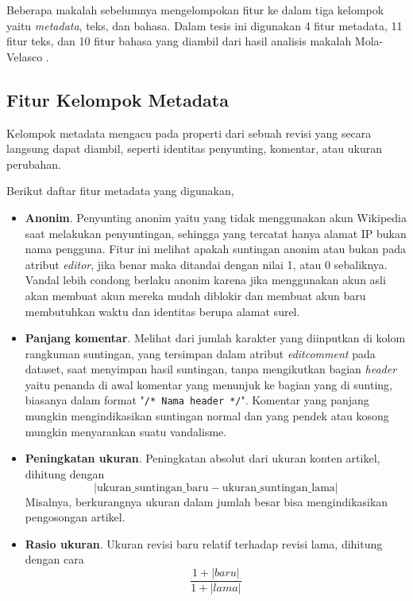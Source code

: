 Beberapa makalah sebelumnya mengelompokan fitur ke dalam tiga kelompok yaitu
\textit{metadata}, teks, dan bahasa.
Dalam tesis ini digunakan 4 fitur metadata, 11 fitur teks, dan 10 fitur
bahasa yang diambil dari hasil analisis makalah Mola-Velasco
\cite{mola2012wikipedia}.

\subsection{Fitur Kelompok Metadata}

Kelompok metadata mengacu pada properti dari sebuah revisi yang secara langsung
dapat diambil, seperti identitas penyunting, komentar, atau ukuran perubahan.

Berikut daftar fitur metadata yang digunakan,

\begin{itemize}

\item \textbf{Anonim}.
Penyunting anonim yaitu yang tidak menggunakan akun Wikipedia saat melakukan
penyuntingan, sehingga yang tercatat hanya alamat IP bukan nama pengguna.
Fitur ini melihat apakah suntingan anonim atau bukan pada atribut
\textit{editor}, jika benar maka ditandai dengan nilai 1, atau 0 sebaliknya.
Vandal lebih condong berlaku anonim karena jika menggunakan akun asli akan
membuat akun mereka mudah diblokir dan membuat akun baru membutuhkan waktu dan
identitas berupa alamat surel.

\item \textbf{Panjang komentar}.
Melihat dari jumlah karakter yang diinputkan di kolom rangkuman suntingan, yang
tersimpan dalam atribut \textit{editcomment} pada dataset, saat menyimpan hasil
suntingan, tanpa mengikutkan bagian \textit{header} yaitu penanda di awal
komentar yang menunjuk ke bagian yang di sunting, biasanya dalam format
"\texttt{/* Nama header */}".
Komentar yang panjang mungkin mengindikasikan suntingan normal dan yang pendek
atau kosong mungkin menyarankan suatu vandalisme.

\item \textbf{Peningkatan ukuran}.
Peningkatan absolut dari ukuran konten artikel, dihitung dengan
\[
|\text{ukuran\_suntingan\_baru} - \text{ukuran\_suntingan\_lama}|
\]
Misalnya, berkurangnya ukuran dalam jumlah besar bisa mengindikasikan
pengosongan artikel.

\item \textbf{Rasio ukuran}.
Ukuran revisi baru relatif terhadap revisi lama, dihitung dengan cara
\[
\frac{1 + |baru|}{1 + |lama|}
\]

\end{itemize}


